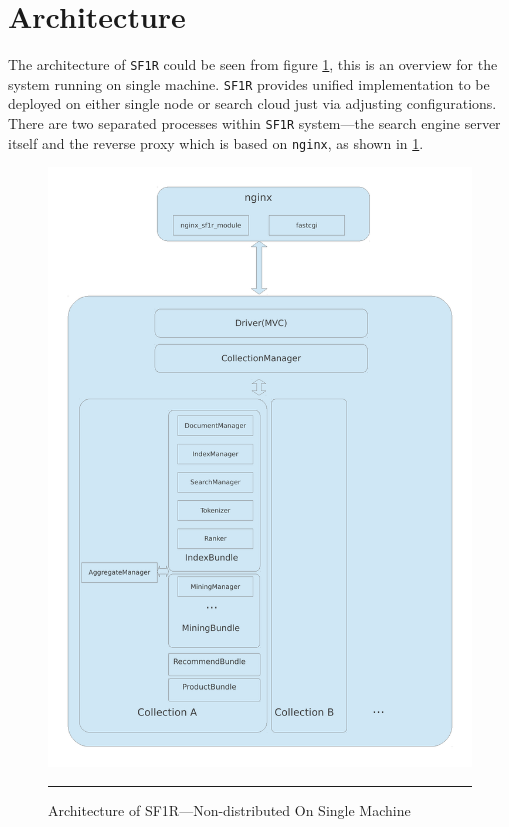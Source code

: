 \section{Architecture}
The architecture of \texttt{SF1R} could be seen from figure \ref{fig:sf1_architecture}, this is an overview for the system running on single machine. \texttt{SF1R}
provides unified implementation to be deployed on either single node or search cloud just via adjusting configurations. There are two separated processes within \texttt{SF1R}
system---the search engine server itself and the reverse proxy which is based on \texttt{nginx}, as shown in \ref{fig:sf1_architecture}.
\begin{figure}[htbp]
  \centering
    \includegraphics[width=.7\textwidth]{Figures/sf1.pdf}
    \rule{35em}{0.5pt}
  \caption[Architecture of SF1R]{Architecture of SF1R---Non-distributed On Single Machine}
  \label{fig:sf1_architecture}
\end{figure}

